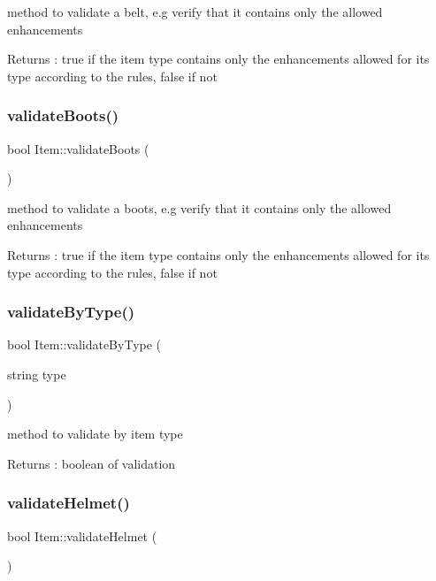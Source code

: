 method to validate a belt, e.\+g verify that it contains only the allowed enhancements \begin{DoxyReturn}{Returns}
\+: true if the item type contains only the enhancements allowed for its type according to the rules, false if not 
\end{DoxyReturn}
\hypertarget{class_item_a0139f295ddb22a4d84d4a514fe944d5c}{}\label{class_item_a0139f295ddb22a4d84d4a514fe944d5c} 
\subsubsection{\texorpdfstring{validate\+Boots()}{validateBoots()}}
{\footnotesize\ttfamily bool Item\+::validate\+Boots (\begin{DoxyParamCaption}{ }\end{DoxyParamCaption})}

method to validate a boots, e.\+g verify that it contains only the allowed enhancements \begin{DoxyReturn}{Returns}
\+: true if the item type contains only the enhancements allowed for its type according to the rules, false if not 
\end{DoxyReturn}
\hypertarget{class_item_a441910e3bbac14b7a37fbc4aa47283a6}{}\label{class_item_a441910e3bbac14b7a37fbc4aa47283a6} 
\subsubsection{\texorpdfstring{validate\+By\+Type()}{validateByType()}}
{\footnotesize\ttfamily bool Item\+::validate\+By\+Type (\begin{DoxyParamCaption}\item[{string}]{type }\end{DoxyParamCaption})}

method to validate by item type \begin{DoxyReturn}{Returns}
\+: boolean of validation 
\end{DoxyReturn}
\hypertarget{class_item_aa8ddc87ca9c68d3e5425c7de4fd731d6}{}\label{class_item_aa8ddc87ca9c68d3e5425c7de4fd731d6} 
\subsubsection{\texorpdfstring{validate\+Helmet()}{validateHelmet()}}
{\footnotesize\ttfamily bool Item\+::validate\+Helmet (\begin{DoxyParamCaption}{ }\end{DoxyParamCaption})}

